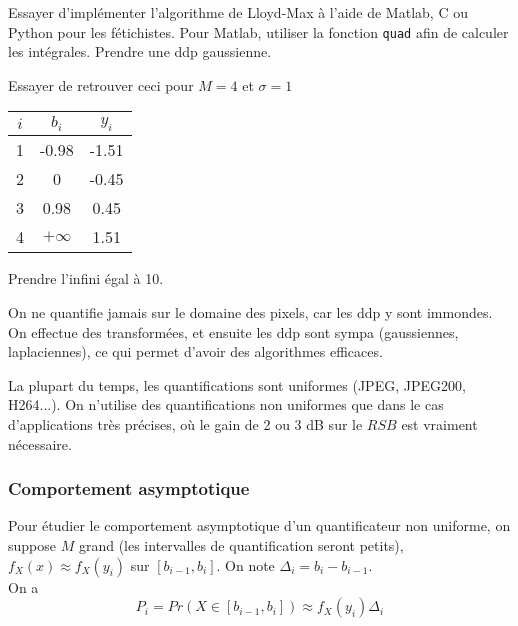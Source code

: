 \documentclass[main.tex]{subfiles}
\begin{document}
\begin{rem}
Essayer d'implémenter l'algorithme de Lloyd-Max à l'aide de Matlab, C ou Python pour les fétichistes. Pour Matlab, utiliser la fonction \texttt{quad} afin de calculer les intégrales. Prendre une ddp gaussienne.

Essayer de retrouver ceci pour $M=4$ et $\sigma = 1$
\begin{center}
\begin{tabular}{ccc}
$i$ & $b_i$ & $y_i$ \\ \hline
1 & -0.98 & -1.51 \\
2 & 0 & -0.45 \\
3 & 0.98 & 0.45 \\
4 & $+\infty$ & 1.51 \\
\end{tabular}
\end{center}

Prendre l'infini égal à 10.
\end{rem}

\begin{rem}
On ne quantifie jamais sur le domaine des pixels, car les ddp y sont immondes. On effectue des transformées, et ensuite les ddp sont sympa (gaussiennes, laplaciennes), ce qui permet d'avoir des algorithmes efficaces.

La plupart du temps, les quantifications sont uniformes (JPEG, JPEG200, H264...). On n'utilise des quantifications non uniformes que dans le cas d'applications très précises, où le gain de 2 ou 3 dB sur le $RSB$ est vraiment nécessaire.
\end{rem}


\subsubsection{Comportement asymptotique}
Pour étudier le comportement asymptotique d'un quantificateur non uniforme, on suppose $M$ grand (les intervalles de quantification seront petits), $f_X(x) \approx f_X(y_i)$ sur $[b_{i-1},b_i]$. On note $\Delta_i = b_i - b_{i-1}$.\\

On a \[P_i = Pr(X\in[b_{i-1},b_i]) \approx f_X(y_i)\Delta_i\]
\end{document}
